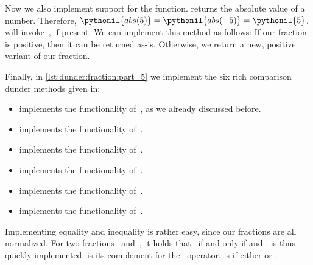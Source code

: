 Now we also implement support for the  function.
 returns the absolute value of a number.
Therefore, $\pythonil{abs(5)}=\pythonil{abs(-5)}=\pythonil{5}$.
 will invoke~, if present.
We can implement this method as follows:
If our fraction is positive, then it can be returned as-is.
Otherwise, we return a new, positive variant of our fraction.

%
%
%
%
%
%
Finally, in \cref{lst:dunder:fraction:part_5} we implement the six rich comparison dunder methods given in:%
%
\begin{itemize}%
\item {} implements the functionality of~\pythonilIdx{==}, as we already discussed before.%
%
\item {} implements the functionality of~\pythonil{!=}.%
%
\item {} implements the functionality of~\pythonilIdx{<}.%
%
\item {} implements the functionality of~\pythonil{<=}\pythonIdx{<=}.%
%
\item {} implements the functionality of~\pythonilIdx{>}.%
%
\item {} implements the functionality of~\pythonil{>=}\pythonIdx{>=}.%
\end{itemize}%
%
Implementing equality and inequality is rather easy, since our fractions are all normalized.
For two fractions~ and~, it holds that~ if and only if  and .
 is thus quickly implemented.
 is its complement for the \pythonil{!=}~operator.
 is  if either  or .

